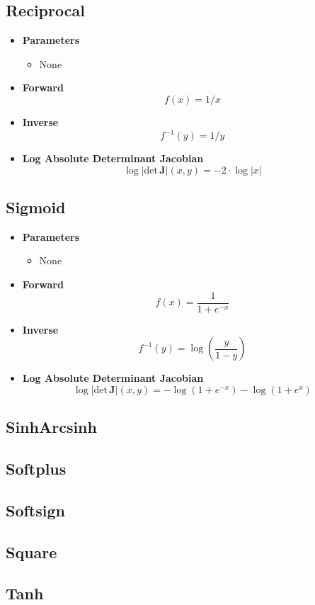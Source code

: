 \subsection{Reciprocal}
\begin{itemize}
  \item \textbf{Parameters}
  \begin{itemize}
    \item None
  \end{itemize}
  \item \textbf{Forward}
  \begin{equation}
    f(x) = 1 / x
  \end{equation}
  \item \textbf{Inverse}
  \begin{equation}
    f^{-1}(y) = 1 / y
  \end{equation}
  \item \textbf{Log Absolute Determinant Jacobian}
  \begin{equation}
    \log \vert \text{det} \, \mathbf{J} \vert (x, y) = -2 \cdot \log \vert x \vert
  \end{equation}
\end{itemize}

\subsection{Sigmoid}
\begin{itemize}
  \item \textbf{Parameters}
  \begin{itemize}
    \item None
  \end{itemize}
  \item \textbf{Forward}
  \begin{equation}
    f(x) = \frac{1}{1 + e^{-x}}
  \end{equation}
  \item \textbf{Inverse}
  \begin{equation}
    f^{-1}(y) = \log \left( \frac{y}{1 - y} \right)
  \end{equation}
  \item \textbf{Log Absolute Determinant Jacobian}
  \begin{equation}
    \log \vert \text{det} \, \mathbf{J} \vert (x, y) = -\log\left( 1 + e^{-x} \right) - \log\left( 1 + e^{x} \right)
  \end{equation}
\end{itemize}

\subsection{SinhArcsinh}

\subsection{Softplus}

\subsection{Softsign}

\subsection{Square}

\subsection{Tanh}
